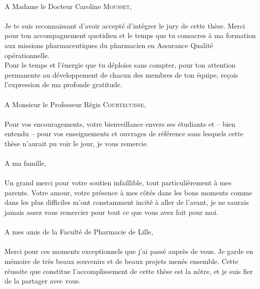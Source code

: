{{{\paragraph*{}
A Madame le Docteur Caroline \textsc{Mousset},
\paragraph*{}
Je te suis reconnaissant d'avoir accept\'{e} d'int\'{e}grer le jury de cette th\`{e}se. Merci pour ton accompagnement quotidien et le temps que tu consacres \`{a} ma formation aux missions pharmaceutiques du pharmacien en Assurance Qualit\'{e} op\'{e}rationnelle. \\
Pour le temps et l'\'{e}nergie que tu d\'{e}ploies sans compter, pour ton attention permanente au d\'{e}veloppement de chacun des membres de ton \'{e}quipe, re\c{c}ois l'expression de ma profonde gratitude.
\vspace{5mm}
\paragraph*{}
A Monsieur le Professeur R\'{e}gis \textsc{Courtecuisse},
\paragraph*{}
Pour vos encouragements, votre bienveillance envers ses \'{e}tudiants et -- bien entendu -- pour vos enseignements et ouvrages de r\'{e}f\'{e}rence sans lesquels cette th\`{e}se n'aurait pu voir le jour, je vous remercie.
\cleardoublepage
\paragraph*{}
A ma famille,
\paragraph*{}
Un grand merci pour votre soutien infaillible, tout particuli\`{e}rement \`{a} mes parents. Votre amour, votre pr\'{e}sence \`{a} mes c\^ {o}t\'{e}s dans les bons moments comme dans les plus difficiles m'ont constamment incit\'{e} \`{a} aller de l'avant, je ne saurais jamais assez vous remercier pour tout ce que vous avez fait pour moi.
\vspace{5mm}
\paragraph*{}
A mes amis de la Facult\'{e} de Pharmacie de Lille,
\paragraph*{}
Merci pour ces moments exceptionnels que j'ai pass\'{e} aupr\`{e}s de vous. Je garde en m\'{e}moire de tr\`{e}s beaux souvenirs et de beaux projets men\'{e}s ensemble. Cette r\'{e}ussite que constitue l'accomplissement de cette th\`{e}se est la n\^ {o}tre, et je suis fier de la partager avec vous.
}}}
